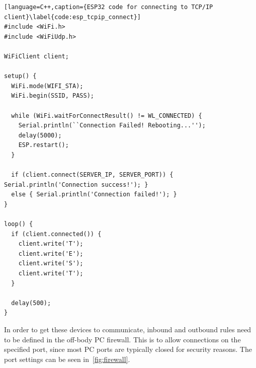 \begin{lstlisting}[language=C++,caption={ESP32 code for connecting to TCP/IP client}\label{code:esp_tcpip_connect}]
#include <WiFi.h>
#include <WiFiUdp.h>

WiFiClient client;

setup() {
  WiFi.mode(WIFI_STA);
  WiFi.begin(SSID, PASS);

  while (WiFi.waitForConnectResult() != WL_CONNECTED) {
    Serial.println(``Connection Failed! Rebooting...'');
    delay(5000);
    ESP.restart();
  }

  if (client.connect(SERVER_IP, SERVER_PORT)) { Serial.println('Connection success!'); }
  else { Serial.println('Connection failed!'); }
}

loop() {
  if (client.connected()) {
    client.write('T');
    client.write('E');
    client.write('S');
    client.write('T');
  }

  delay(500);
}
\end{lstlisting}



In order to get these devices to communicate, inbound and outbound rules need to be defined in the off-body PC firewall.
This is to allow connections on the specified port, since most PC ports are typically closed for security reasons.
The port settings can be seen in~\autoref{fig:firewall}.

